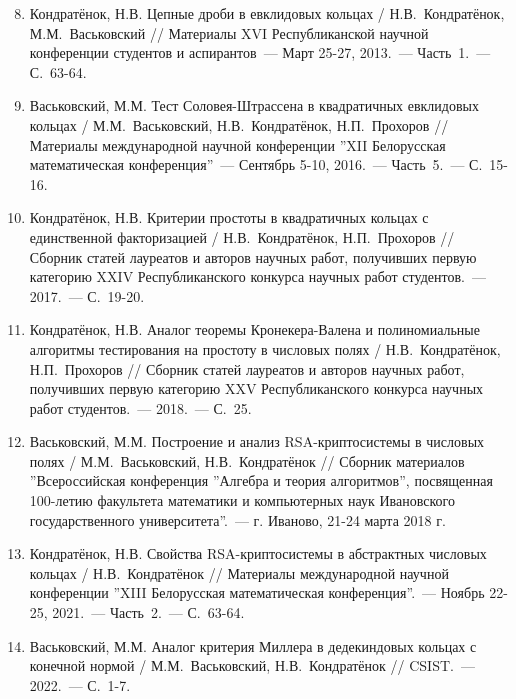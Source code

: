 \documentclass[_00_autoref.tex]{subfiles}
\begin{document}
\begin{enumerate}
\setcounter{enumi}{7}

    \item \label{source:Republican_Scientific_Conference_of_Students_and_Postgraduates_2013}
    Кондратёнок, Н.В. Цепные дроби в евклидовых кольцах / Н.В.~Кондратёнок, М.М.~Васьковский // Материалы XVI Республиканской научной конференции студентов и аспирантов~--- Март 25-27, 2013.~--- Часть~1.~--- С.~63-64.

    \item \label{source:XII_Belarussian_math_conference_2016}
    Васьковский, М.М. Тест Соловея-Штрассена в квадратичных евклидовых кольцах / М.М.~Васьковский, Н.В.~Кондратёнок, Н.П.~Прохоров // Материалы международной научной конференции ''XII Белорусская математическая конференция''~--- Сентябрь 5-10, 2016.~--- Часть~5.~--- С.~15-16.

    \item \label{source:Collection_of_articles_by_laureates_2017}
    Кондратёнок, Н.В. Критерии простоты в квадратичных кольцах с единственной факторизацией / Н.В.~Кондратёнок, Н.П.~Прохоров // Сборник статей лауреатов и авторов научных работ, получивших первую категорию XXIV Республиканского конкурса научных работ студентов.~--- 2017.~--- С.~19-20.

    \item \label{source:Collection_of_articles_by_laureates_2018}
    Кондратёнок, Н.В. Аналог теоремы Кронекера-Валена и полиномиальные алгоритмы тестирования на простоту в числовых полях / Н.В.~Кондратёнок, Н.П.~Прохоров // Сборник статей лауреатов и авторов научных работ, получивших первую категорию XXV Республиканского конкурса научных работ студентов.~--- 2018.~--- С.~25.

    \item \label{source:Algebra_and_theory_of_algorithms}
    Васьковский, М.М. Построение и анализ RSA-криптосистемы в числовых полях / М.М.~Васьковский, Н.В.~Кондратёнок // Сборник материалов ''Всероссийская конференция ''Алгебра и теория алгоритмов'', посвященная 100-летию факультета математики и компьютерных наук Ивановского государственного университета''.~--- г. Иваново, 21-24 марта 2018 г.

    \item \label{source:XIII_Belarussian_math_conference_2021}
    Кондратёнок, Н.В. Свойства RSA-криптосистемы в абстрактных числовых кольцах / Н.В.~Кондратёнок // Материалы международной научной конференции ''XIII Белорусская математическая конференция''.~--- Ноябрь 22-25, 2021.~--- Часть~2.~--- С.~63-64.

    \item \label{source:CSIST_2022}
    Васьковский, М.М. Аналог критерия Миллера в дедекиндовых кольцах с конечной нормой / М.М.~Васьковский, Н.В.~Кондратёнок // CSIST.~--- 2022.~--- С.~1-7.

\end{enumerate}
\end{document}
